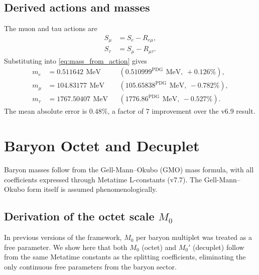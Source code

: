 \documentclass[aps,prd,reprint,twocolumn,showpacs,superscriptaddress]{revtex4-2}
\newcommand{\mev}{\,\text{MeV}}
\newcommand{\PDG}[1]{\ensuremath{#1^{\text{PDG}}}}
\begin{document}
\subsection{Derived actions and masses}

The muon and tau actions are
\begin{align}
S_\mu &= S_e - R_{e\mu}, \\
S_\tau &= S_\mu - R_{\mu\tau}.
\end{align}
Substituting into \eqref{eq:mass_from_action} gives
\begin{align}
m_e &= 0.511642\ \mev &&(\PDG{0.510999}\ \mev,\ +0.126\%), \\
m_\mu &= 104.83177\ \mev &&(\PDG{105.65838}\ \mev,\ -0.782\%), \\
m_\tau &= 1767.50407\ \mev &&(\PDG{1776.86}\ \mev,\ -0.527\%).
\end{align}
The mean absolute error is $0.48\%$, a factor of 7 improvement over the
v6.9 result.

\section{Baryon Octet and Decuplet}
\label{sec:baryons}

Baryon masses follow from the Gell-Mann--Okubo (GMO) mass formula, with
all coefficients expressed through Metatime L-constants (v7.7).
The Gell-Mann--Okubo form itself is assumed phenomenologically.

\subsection{Derivation of the octet scale $M_0$}

In previous versions of the framework, $M_0$ per baryon multiplet was
treated as a free parameter.  We show here that both $M_0$ (octet) and
$M_0'$ (decuplet) follow from the same Metatime constants as the
splitting coefficients, eliminating the only continuous free parameters
from the baryon sector.
\end{document}

